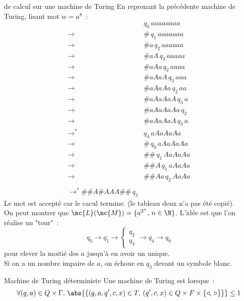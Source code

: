 \begin{exemple}{}{de calcul sur une machine de Turing}
    En reprenant la précédente machine de Turing, lisant mot $w = a^8$~:
    \begin{align*}
        &q_0\,aaaaaaaa \\
        \rightarrow & \#\, q_1\, aaaaaaa \\
        \rightarrow & \#a\, q_2\, aaaaaa \\
        \rightarrow & \#aA\, q_3\, aaaaa \\
        \rightarrow & \#aAa\, q_2\, aaaa  \\
        \rightarrow & \#aAaA\, q_3\, aaa \\
        \rightarrow & \#aAaAa\, q_2\, aa  \\
        \rightarrow & \#aAaAaA\, q_3\, a \\
        \rightarrow & \#aAaAaAa\, q_2 \\
        \rightarrow & \#aAaAaA\, q_3\, a  \\
        \rightarrow^* & q_4\, aAaAaAa \\
        \rightarrow & \#\,q_0\, aAaAaAa \\
        \rightarrow & \#\#\, q_1\, AaAaAa \\
        \rightarrow & \#\# A\, q_1 \, aAaAa \\
        \rightarrow & \#\#Aa\, q_2\, AaAa\\\\
        \rightarrow^* \#\#A\#AAA\#\#\, q_5
    \end{align*}
    Le mot est accepté car le cacul termine. (le tableau deux n'a pas été copié).\\
    On peut montrer que $\mc{L}(\mc{M}) = \{a^{2^n},\,  n\in \N\}$. L'idée est que l'on réalise un "tour"~:
    $$q_0 \to q_1 \to \begin{cases*}
        q_2\\ q_3
    \end{cases*} \to q_4 \to q_0$$
    pour elever la moitié des $a$ jusqu'à en avoir un unique.\\
    Si on a un nombre impaire de $a$, on échoue en $q_3$ devant un symbole blanc.
\end{exemple}

\begin{definition}{}{Machine de Turing déterministe}
    Une machine de Turing est  lorsque~:
    $$\forall (q,a) \in Q \times \Gamma,\, \abs{\{(q,a,q',c,x) \in T,\, (q',c,x) \in Q\times F\times\{\triangleleft,\, \triangleright\}\}} \leq 1$$
\end{definition}

